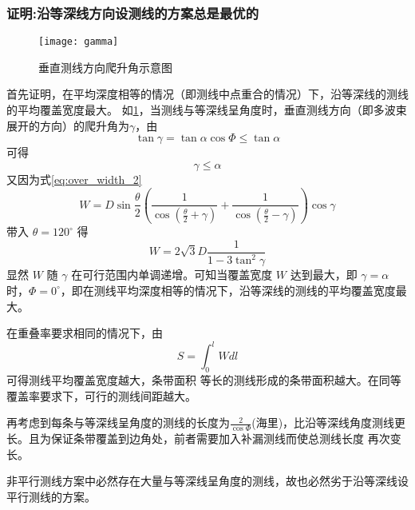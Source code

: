 \documentclass[withoutpreface,bwprint]{cumcmthesis} %
\begin{document}
        \subsubsection{证明:沿等深线方向设测线的方案总是最优的}
        \begin{figure}[H]
            \centering
            \texttt{[image: gamma]}
            \caption{垂直测线方向爬升角示意图}
            \label{fig:gamma2}
        \end{figure}
        首先证明，在平均深度相等的情况（即测线中点重合的情况）下，沿等深线的测线的平均覆盖宽度最大。
        如\cref{fig:gamma2}，当测线与等深线呈角度时，垂直测线方向（即多波束展开的方向）的爬升角为$\gamma$，由
        \begin{equation}
            \tan \gamma = \tan \alpha \cos \Phi \leq \tan \alpha
            \label{eq: solve_gamma}
        \end{equation} 
        可得
        \begin{equation}
            \gamma \leq \alpha
            \label{eq: result2}
        \end{equation} 
        又因为式\cref{eq:over_width_2}
        $$
            W = D\sin\frac{\theta}{2}(\frac{1}{\cos(\frac{\theta}{2}+\gamma)} + \frac{1}{\cos(\frac{\theta}{2} - \gamma)})\cos\gamma
        $$
        带入 $\theta = 120^\circ$ 得
        \begin{equation}
            W = 2\sqrt{3} D \frac{1}{1 - 3\tan^2 \gamma}
            \label{eq: result3}
        \end{equation} 
        显然 $W$ 随 $\gamma$ 在可行范围内单调递增。可知当覆盖宽度 $W$ 达到最大，即 $\gamma = \alpha$ 时，$\Phi = 0^\circ$，即在测线平均深度相等的情况下，沿等深线的测线的平均覆盖宽度最大。
        
        在重叠率要求相同的情况下，由
        \begin{equation}
            S = \int_{0}^l Wdl
            \label{eq: S}
        \end{equation} 
        可得测线平均覆盖宽度越大，条带面积
        等长的测线形成的条带面积越大。在同等覆盖率要求下，可行的测线间距越大。

        再考虑到每条与等深线呈角度的测线的长度为$\frac{2}{\cos\Phi}$(海里)，比沿等深线角度测线更长。且为保证条带覆盖到边角处，前者需要加入补漏测线而使总测线长度
        再次变长。

        非平行测线方案中必然存在大量与等深线呈角度的测线，故也必然劣于沿等深线设平行测线的方案。
        
        
\end{document}
